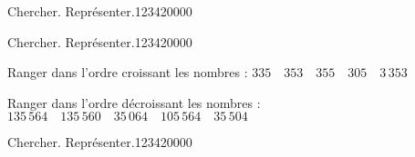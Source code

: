\begin{pageParcoursd}
\begin{ExoCd}{Chercher. Représenter.}{1234}{2}{0}{0}{0}{0}
 
\end{ExoCd}

\begin{ExoCd}{Chercher. Représenter.}{1234}{2}{0}{0}{0}{0}

Ranger dans l'ordre croissant les nombres : $3 35 \quad 3 53 \quad 3 55 \quad 3 05 \quad 3\,353$ \vspace{0.1cm}



Ranger dans l'ordre décroissant les nombres : $135\,564 \quad 135\,560 \quad 35\,064 \quad 105\,564 \quad 35\,504$ \vspace{0.1cm}

\end{ExoCd}


\begin{ExoCd}{Chercher. Représenter.}{1234}{2}{0}{0}{0}{0}

\begin{minipage}{0.75\linewidth}



\end{minipage}
\end{ExoCd}
\end{pageParcoursd}
